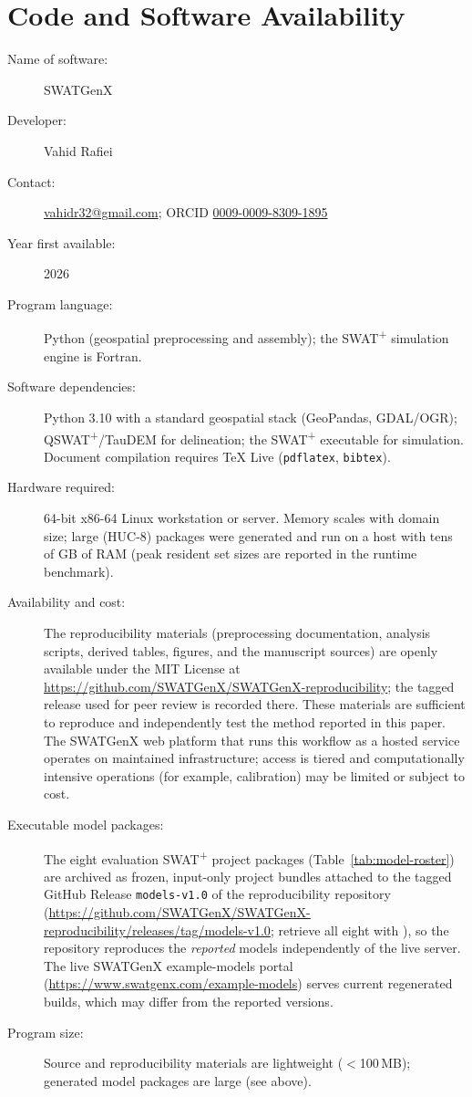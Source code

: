 \section*{Code and Software Availability}

\noindent
\begin{description}
  \item[Name of software:] SWATGenX
  \item[Developer:] Vahid Rafiei
  \item[Contact:] \href{mailto:vahidr32@gmail.com}{vahidr32@gmail.com}; ORCID \href{https://orcid.org/0009-0009-8309-1895}{0009-0009-8309-1895}
  \item[Year first available:] 2026
  \item[Program language:] Python (geospatial preprocessing and assembly); the SWAT\textsuperscript{+} simulation engine is Fortran.
  \item[Software dependencies:] Python 3.10 with a standard geospatial stack (GeoPandas, GDAL/OGR); QSWAT\textsuperscript{+}/TauDEM for delineation; the SWAT\textsuperscript{+} executable for simulation. Document compilation requires TeX Live (\texttt{pdflatex}, \texttt{bibtex}).
  \item[Hardware required:] 64-bit x86-64 Linux workstation or server. Memory scales with domain size; large (HUC-8) packages were generated and run on a host with tens of GB of RAM (peak resident set sizes are reported in the runtime benchmark).
  \item[Availability and cost:] The reproducibility materials (preprocessing documentation, analysis scripts, derived tables, figures, and the manuscript sources) are openly available under the MIT License at \url{https://github.com/SWATGenX/SWATGenX-reproducibility}; the tagged release used for peer review is recorded there. These materials are sufficient to reproduce and independently test the method reported in this paper. The SWATGenX web platform that runs this workflow as a hosted service operates on maintained infrastructure; access is tiered and computationally intensive operations (for example, calibration) may be limited or subject to cost.
  \item[Executable model packages:] The eight evaluation SWAT\textsuperscript{+} project packages (Table~\ref{tab:model-roster}) are archived as frozen, input-only project bundles attached to the tagged GitHub Release \texttt{models-v1.0} of the reproducibility repository (\url{https://github.com/SWATGenX/SWATGenX-reproducibility/releases/tag/models-v1.0}; retrieve all eight with ), so the repository reproduces the \emph{reported} models independently of the live server. The live SWATGenX example-models portal (\url{https://www.swatgenx.com/example-models}) serves current regenerated builds, which may differ from the reported versions.
  \item[Program size:] Source and reproducibility materials are lightweight ($<$100\,MB); generated model packages are large (see above).
\end{description}
